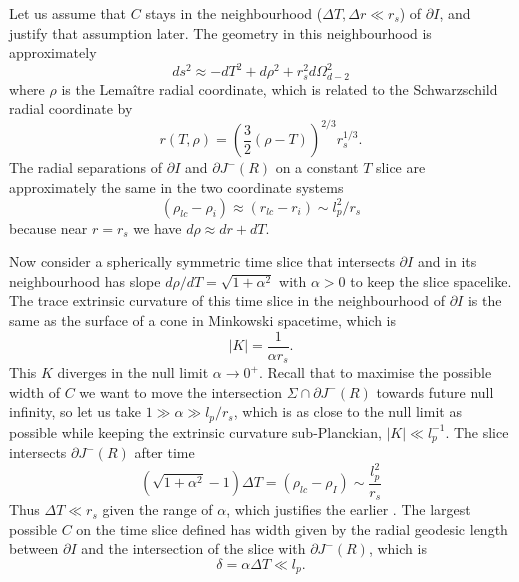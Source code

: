 \documentclass[a4paper,11pt]{article}
\def\bne{\begin{equation}}
\def\ene{\end{equation}}
\newcommand{\del}{\partial}
\begin{document}
Let us assume that $C$ stays in the neighbourhood ($\Delta T , \Delta r \ll r_s$) of $\del I$, and justify that assumption later. The geometry in this neighbourhood is approximately
\bne \label{eq:approx_geom} ds^2 \approx - dT^2 + d\rho^2 + r_s^2 d\Omega^2_{d-2} \ene
where $\rho$ is the Lema\^itre radial coordinate, which is related to the Schwarzschild radial coordinate by
\bne r(T , \rho) = \left( \frac{3}{2}(\rho - T) \right )^{2/3} r_s^{1/3}. \ene
The radial separations of $\del I$ and $\del J^- (R)$ on a constant $T$ slice are approximately the same in the two coordinate systems
\bne (\rho_{lc} - \rho_i) \approx (r_{lc} - r_i) \sim l_p^2 / r_s \ene
because near $r = r_s$ we have $d\rho \approx dr + dT$.

Now consider a spherically symmetric time slice that intersects $\del I$ and in its neighbourhood has slope $d\rho / dT = \sqrt{1+\alpha^2}$ with $\alpha > 0$ to keep the slice spacelike. The trace extrinsic curvature of this time slice in the neighbourhood of $\del I$ is the same as the surface of a cone in Minkowski spacetime, which is 
\bne \label{eq:Kform} |K| = \frac{1}{\alpha r_s}. \ene
This $K$ diverges in the null limit $\alpha \to 0^+$. Recall that to maximise the possible width of $C$ we want to move the intersection $\Sigma \cap \del J^- (R)$ towards future null infinity, so let us take $1 \gg \alpha \gg l_p / r_s$, which is as close to the null limit as possible while keeping the extrinsic curvature sub-Planckian, $|K| \ll l_p^{-1}$. The slice intersects $\del J^- (R)$ after time 
\bne (\sqrt{1+\alpha^2}-1)\Delta T = (\rho_{lc} - \rho_{I}) \sim \frac{l_p^2}{r_s} \ene
Thus $\Delta T \ll r_s$ given the range of $\alpha$, which justifies the earlier . The largest possible $C$ on the time slice defined has width given by the radial geodesic length between $\del I$ and the intersection of the slice with $\del J^- (R)$, which is
\bne  \delta = \alpha \Delta T \ll l_p . \ene
\end{document}
